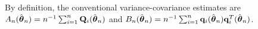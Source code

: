 By definition, the conventional variance-covariance estimates are\\ 
$A_{n}(\hat{\boldsymbol\theta}_{n})=n^{-1}\sum_{i=1}^{n}\mathbf Q_{i}(\hat{\boldsymbol \theta}_{n})$ and $B_{n}(\hat{\boldsymbol\theta}_{n})=n^{-1}\sum_{i=1}^{n}\mathbf q_{i}(\hat{\boldsymbol\theta}_{n})\mathbf q_{i}^{T}(\hat{\boldsymbol\theta}_{n})$. 


